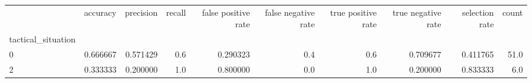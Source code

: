 \begin{tabular}{lrrrrrrrrr}
\toprule
{} &  accuracy &  precision &  recall &  false positive rate &  false negative rate &  true positive rate &  true negative rate &  selection rate &  count \\
tactical\_situation &           &            &         &                      &                      &                     &                     &                 &        \\
\midrule
0                  &  0.666667 &   0.571429 &     0.6 &             0.290323 &                  0.4 &                 0.6 &            0.709677 &        0.411765 &   51.0 \\
2                  &  0.333333 &   0.200000 &     1.0 &             0.800000 &                  0.0 &                 1.0 &            0.200000 &        0.833333 &    6.0 \\
\bottomrule
\end{tabular}
